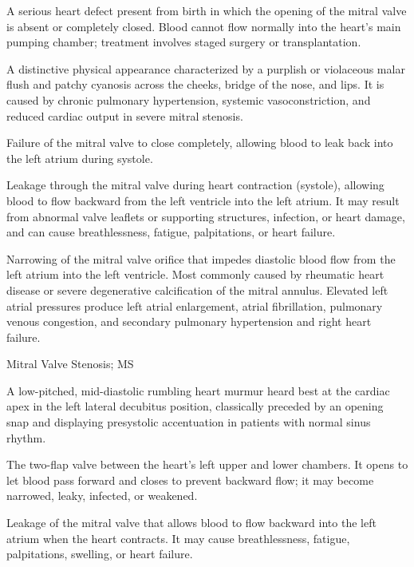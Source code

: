  A serious heart defect present from birth in which the opening of the mitral valve is absent or completely closed. Blood cannot flow normally into the heart’s main pumping chamber; treatment involves staged surgery or transplantation.

 A distinctive physical appearance characterized by a purplish or violaceous malar flush and patchy cyanosis across the cheeks, bridge of the nose, and lips. It is caused by chronic pulmonary hypertension, systemic vasoconstriction, and reduced cardiac output in severe mitral stenosis.

 Failure of the mitral valve to close completely, allowing blood to leak back into the left atrium during systole.

 Leakage through the mitral valve during heart contraction (systole), allowing blood to flow backward from the left ventricle into the left atrium. It may result from abnormal valve leaflets or supporting structures, infection, or heart damage, and can cause breathlessness, fatigue, palpitations, or heart failure.

 Narrowing of the mitral valve orifice that impedes diastolic blood flow from the left atrium into the left ventricle. Most commonly caused by rheumatic heart disease or severe degenerative calcification of the mitral annulus. Elevated left atrial pressures produce left atrial enlargement, atrial fibrillation, pulmonary venous congestion, and secondary pulmonary hypertension and right heart failure.

\synonyms
Mitral Valve Stenosis; MS

 A low-pitched, mid-diastolic rumbling heart murmur heard best at the cardiac apex in the left lateral decubitus position, classically preceded by an opening snap and displaying presystolic accentuation in patients with normal sinus rhythm.

 The two-flap valve between the heart’s left upper and lower chambers. It opens to let blood pass forward and closes to prevent backward flow; it may become narrowed, leaky, infected, or weakened.

 Leakage of the mitral valve that allows blood to flow backward into the left atrium when the heart contracts. It may cause breathlessness, fatigue, palpitations, swelling, or heart failure.

